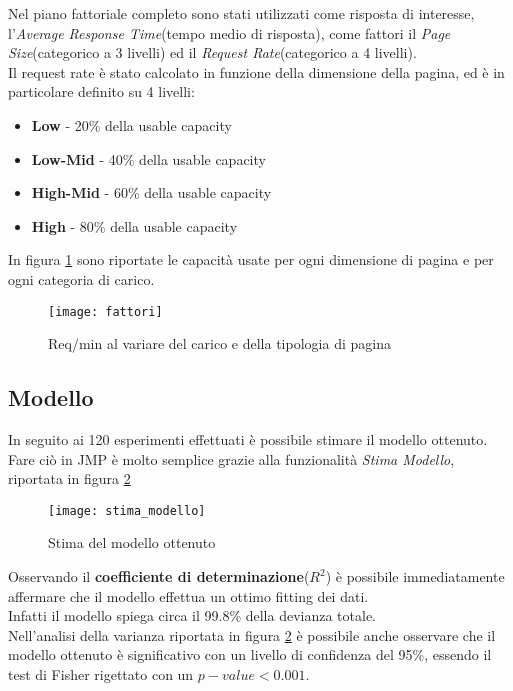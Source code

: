 Nel piano fattoriale completo sono stati utilizzati come risposta di interesse,
l'\textit{Average Response Time}(tempo medio di risposta), come fattori il
\textit{Page Size}(categorico a 3 livelli) ed il \textit{Request Rate}(categorico
 a 4 livelli).\\
Il request rate è stato calcolato in funzione della dimensione della pagina,
ed è in particolare definito su 4 livelli:
\begin{itemize}
  \item \textbf{Low} - 20\% della usable capacity
  \item \textbf{Low-Mid} - 40\% della usable capacity
  \item \textbf{High-Mid} - 60\% della usable capacity
  \item \textbf{High} - 80\% della usable capacity
\end{itemize}

In figura \ref{webserver_fattori} sono riportate le capacità usate per ogni dimensione di
pagina e per ogni categoria di carico.\\

\begin{figure}[!htbp]
  \centering
  \texttt{[image: fattori]}
  \caption{Req/min al variare del carico e della tipologia di pagina}
  \label{webserver_fattori}
\end{figure}

\clearpage

\subsection{Modello}
In seguito ai 120 esperimenti effettuati è possibile stimare il modello ottenuto.\\
Fare ciò in JMP è molto semplice grazie alla funzionalità \textit{Stima Modello},
riportata in figura \ref{webserver_stima_modello}

\begin{figure}[!htbp]
  \centering
  \texttt{[image: stima\_modello]}
  \caption{Stima del modello ottenuto}
  \label{webserver_stima_modello}
\end{figure}

Osservando il \textbf{coefficiente di determinazione}($R^{2}$) è possibile
immediatamente affermare che il modello effettua un ottimo fitting dei dati.\\
Infatti il modello spiega circa il 99.8\% della devianza totale.\\
Nell'analisi della varianza riportata in figura \ref{webserver_stima_modello} è possibile anche
osservare che il modello ottenuto è significativo con un livello di confidenza
del 95\%, essendo il test di Fisher rigettato con un $p-value<0.001$.\\

